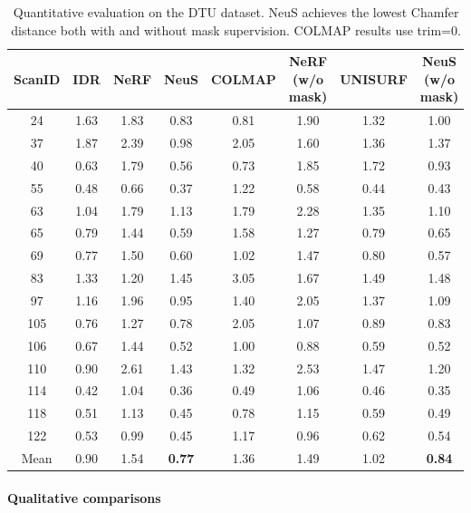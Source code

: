 \begin{enrichment}
\begin{enrichment}
        \begin{table}[H]
            \centering
            \begin{tabular}{c|cccc|ccc}
                \hline
                ScanID & IDR & NeRF & NeuS & COLMAP & NeRF (w/o mask) & UNISURF & NeuS (w/o mask) \\
                \hline
                24 & 1.63 & 1.83 & 0.83 & 0.81 & 1.90 & 1.32 & 1.00 \\
                37 & 1.87 & 2.39 & 0.98 & 2.05 & 1.60 & 1.36 & 1.37 \\
                40 & 0.63 & 1.79 & 0.56 & 0.73 & 1.85 & 1.72 & 0.93 \\
                55 & 0.48 & 0.66 & 0.37 & 1.22 & 0.58 & 0.44 & 0.43 \\
                63 & 1.04 & 1.79 & 1.13 & 1.79 & 2.28 & 1.35 & 1.10 \\
                65 & 0.79 & 1.44 & 0.59 & 1.58 & 1.27 & 0.79 & 0.65 \\
                69 & 0.77 & 1.50 & 0.60 & 1.02 & 1.47 & 0.80 & 0.57 \\
                83 & 1.33 & 1.20 & 1.45 & 3.05 & 1.67 & 1.49 & 1.48 \\
                97 & 1.16 & 1.96 & 0.95 & 1.40 & 2.05 & 1.37 & 1.09 \\
                105 & 0.76 & 1.27 & 0.78 & 2.05 & 1.07 & 0.89 & 0.83 \\
                106 & 0.67 & 1.44 & 0.52 & 1.00 & 0.88 & 0.59 & 0.52 \\
                110 & 0.90 & 2.61 & 1.43 & 1.32 & 2.53 & 1.47 & 1.20 \\
                114 & 0.42 & 1.04 & 0.36 & 0.49 & 1.06 & 0.46 & 0.35 \\
                118 & 0.51 & 1.13 & 0.45 & 0.78 & 1.15 & 0.59 & 0.49 \\
                122 & 0.53 & 0.99 & 0.45 & 1.17 & 0.96 & 0.62 & 0.54 \\
                \hline
                Mean & 0.90 & 1.54 & \textbf{0.77} & 1.36 & 1.49 & 1.02 & \textbf{0.84} \\
                \hline
            \end{tabular}
            \caption{Quantitative evaluation on the DTU dataset. NeuS achieves the lowest Chamfer distance both with and without mask supervision. COLMAP results use trim=0.}
            \label{tab:chapter23_neus_dtu}
        \end{table}
        
        \paragraph{Qualitative comparisons}  
        

\end{enrichment}
\end{enrichment}
